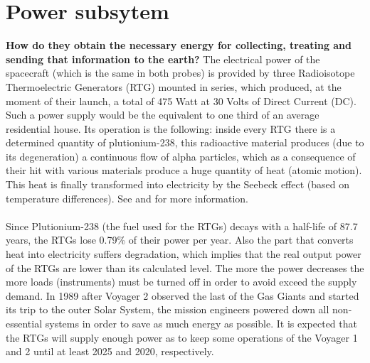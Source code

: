 \documentclass[11pt,a4paper]{article}
\begin{document}
\section{Power subsytem}
\textbf{How do they obtain the necessary energy for collecting, treating and sending that information to the earth?}
The electrical power of the spacecraft (which is the same in both probes) is provided by three Radioisotope Thermoelectric Generators (RTG) mounted in series, which produced, at the moment of their launch, a total of 475 Watt at 30 Volts of Direct Current (DC). Such a power supply would be the equivalent to one third of an average residential house. Its operation is the following: inside every RTG there is a determined quantity of plutionium-238, this radioactive material produces (due to its degeneration) a continuous flow of alpha particles, which as a consequence of their hit with various materials produce a huge quantity of heat (atomic motion). This heat is finally transformed into electricity by the Seebeck effect (based on temperature differences). See \cite{seebeckwikipedia} and \cite{RTG} for more information.
\\\\
Since Plutionium-238 (the fuel used for the RTGs) decays with a half-life of 87.7 years, the RTGs lose 0.79\% of their power per year. Also the part that converts heat into electricity suffers degradation, which implies that the real output power of the RTGs are lower than its calculated level. The more the power decreases the more loads (instruments) must be turned off in order to avoid exceed the supply demand. In 1989 after Voyager 2 observed the last of the Gas Giants and started its trip to the outer Solar System, the mission engineers powered down all non-essential systems in order to save as much energy as possible. It is expected that the RTGs will supply enough power as to keep some operations of the Voyager 1 and 2 until at least 2025 and 2020, respectively.
\end{document}
